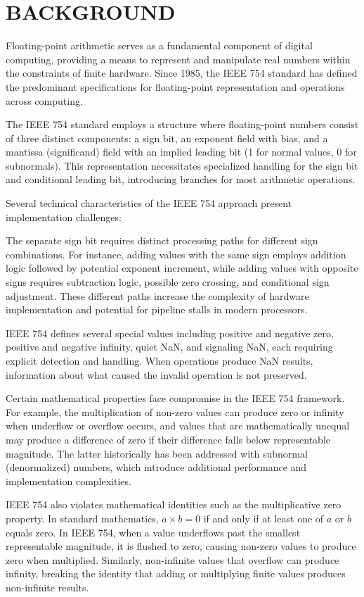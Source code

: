 \documentclass[12pt,letter]{article}
\begin{document}
\section{BACKGROUND}

Floating-point arithmetic serves as a fundamental component of digital computing, providing a means to represent and manipulate real numbers within the constraints of finite hardware. Since 1985, the IEEE 754 standard has defined the predominant specifications for floating-point representation and operations across computing.

The IEEE 754 standard employs a structure where floating-point numbers consist of three distinct components: a sign bit, an exponent field with bias, and a mantissa (significand) field with an implied leading bit (1 for normal values, 0 for subnormals). This representation necessitates specialized handling for the sign bit and conditional leading bit, introducing branches for most arithmetic operations.

Several technical characteristics of the IEEE 754 approach present implementation challenges:

The separate sign bit requires distinct processing paths for different sign combinations. For instance, adding values with the same sign employs addition logic followed by potential exponent increment, while adding values with opposite signs requires subtraction logic, possible zero crossing, and conditional sign adjustment. These different paths increase the complexity of hardware implementation and potential for pipeline stalls in modern processors.

IEEE 754 defines several special values including positive and negative zero, positive and negative infinity, quiet NaN, and signaling NaN, each requiring explicit detection and handling. When operations produce NaN results, information about what caused the invalid operation is not preserved.

Certain mathematical properties face compromise in the IEEE 754 framework. For example, the multiplication of non-zero values can produce zero or infinity when underflow or overflow occurs, and values that are mathematically unequal may produce a difference of zero if their difference falls below representable magnitude. The latter historically has been addressed with subnormal (denormalized) numbers, which introduce additional performance and implementation complexities.

IEEE 754 also violates mathematical identities such as the multiplicative zero property. In standard mathematics, $a \times b = 0$ if and only if at least one of $a$ or $b$ equals zero. In IEEE 754, when a value underflows past the smallest representable magnitude, it is flushed to zero, causing non-zero values to produce zero when multiplied. Similarly, non-infinite values that overflow can produce infinity, breaking the identity that adding or multiplying finite values produces non-infinite results.
\end{document}
